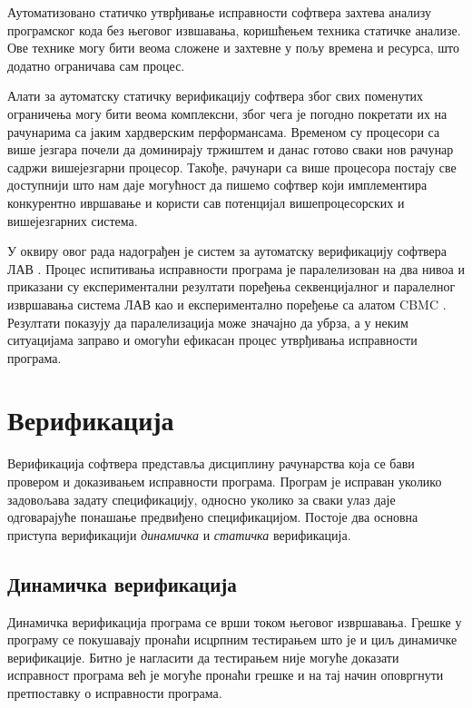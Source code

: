 \documentclass[12pt,oneside]{memoir}
\begin{document}
 Аутоматизовано статичко утврђивање исправности софтвера захтева анализу програмског кода без његовог извшавања, коришћењем техника статичке анализе. Ове технике могу бити веома сложене и захтевне у пољу времена и ресурса, што додатно ограничава сам процес.

 Алати за аутоматску статичку верификацију софтвера због свих поменутих ограничења могу бити веома комплексни, због чега је погодно покретати их на рачунарима са јаким хардверским перформансама. Временом су процесори са више језгара почели да доминирају тржиштем и данас готово сваки нов рачунар садржи вишејезгарни процесор. Такође, рачунари са више процесора постају све доступнији што нам даје могућност да пишемо софтвер који имплементира конкурентно ивршавање и користи сав потенцијал вишепроцесорских и вишејезгарних система.
 
 У оквиру овог рада надограђен је систем за аутоматску верификацију софтвера ЛАВ \cite{mvjphd}. Процес испитивања исправности програма је паралелизован на два нивоа и приказани су експериментални резултати поређења секвенцијалног и паралелног извршавања система ЛАВ као и експериментално поређење са алатом CBMC \cite{cbmc}. Резултати показују да паралелизација може значајно да убрза, а у неким ситуацијама заправо и омогући ефикасан процес утврђивања исправности програма.



\chapter{Верификација}
	Верификација софтвера представља дисциплину рачунарства која се бави провером и доказивањем исправности програма. Програм је исправан уколико задовољава задату спецификацију, односно уколико за сваки улаз даје одговарајуће понашање предвиђено спецификацијом. Постоје два основна приступа верификацији \emph{динамичка} и \emph{статичка} верификација.
  \section{Динамичка верификација}
  Динамичка верификација програма се врши током његовог извршавања. Грешке у програму се покушавају пронаћи исцрпним тестирањем што је и циљ динамичке верификације. Битно је нагласити да тестирањем није могуће доказати исправност програма већ је могуће пронаћи грешке и на тај начин оповргнути претпоставку о исправности програма. 
  
\end{document}
